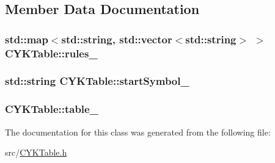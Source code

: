 \subsection{Member Data Documentation}
\hypertarget{classCYKTable_a90179858da18c70ad4338af8661ddc8a}{
\subsubsection[{rules\-\_\-}]{\setlength{\rightskip}{0pt plus 5cm}std\-::map$<$std\-::string, std\-::vector$<$std\-::string$>$ $>$ C\-Y\-K\-Table\-::rules\-\_\-\hspace{0.3cm}{\ttfamily [private]}}}\label{classCYKTable_a90179858da18c70ad4338af8661ddc8a}
\hypertarget{classCYKTable_a789892d83fa60dafe30168633dba22ca}{
\subsubsection[{start\-Symbol\-\_\-}]{\setlength{\rightskip}{0pt plus 5cm}std\-::string C\-Y\-K\-Table\-::start\-Symbol\-\_\-\hspace{0.3cm}{\ttfamily [private]}}}\label{classCYKTable_a789892d83fa60dafe30168633dba22ca}
\hypertarget{classCYKTable_a847f477bcba128dab98ac8cfa987fd04}{
\subsubsection[{table\-\_\-}]{ C\-Y\-K\-Table\-::table\-\_\-\hspace{0.3cm}{\ttfamily [private]}}}\label{classCYKTable_a847f477bcba128dab98ac8cfa987fd04}


The documentation for this class was generated from the following file\-:\begin{DoxyCompactItemize}
\item 
src/\hyperlink{CYKTable_8h}{C\-Y\-K\-Table.\-h}\end{DoxyCompactItemize}

